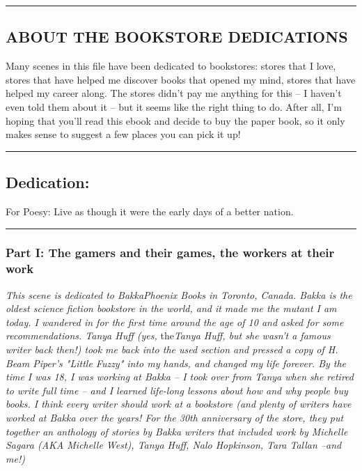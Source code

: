 \begin{center}\rule{3in}{0.4pt}\end{center}

\subsection{ABOUT THE BOOKSTORE DEDICATIONS}

Many scenes in this file have been dedicated to bookstores: stores
that I love, stores that have helped me discover books that opened
my mind, stores that have helped my career along. The stores didn't
pay me anything for this -- I haven't even told them about it --
but it seems like the right thing to do. After all, I'm hoping that
you'll read this ebook and decide to buy the paper book, so it only
makes sense to suggest a few places you can pick it up!

\begin{center}\rule{3in}{0.4pt}\end{center}

\subsection{Dedication:}

For Poesy: Live as though it were the early days of a better
nation.

\begin{center}\rule{3in}{0.4pt}\end{center}

\subsubsection{Part I: The gamers and their games, the workers at their work}

\emph{This scene is dedicated to BakkaPhoenix Books in Toronto, Canada. Bakka is the oldest science fiction bookstore in the world, and it made me the mutant I am today. I wandered in for the first time around the age of 10 and asked for some recommendations. Tanya Huff (yes,}
the\emph{Tanya Huff, but she wasn't a famous writer back then!) took me back into the used section and pressed a copy of H. Beam Piper's "Little Fuzzy" into my hands, and changed my life forever. By the time I was 18, I was working at Bakka -- I took over from Tanya when she retired to write full time -- and I learned life-long lessons about how and why people buy books. I think every writer should work at a bookstore (and plenty of writers have worked at Bakka over the years! For the 30th anniversary of the store, they put together an anthology of stories by Bakka writers that included work by Michelle Sagara (AKA Michelle West), Tanya Huff, Nalo Hopkinson, Tara Tallan --and me!)}

